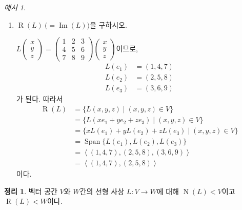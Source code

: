\documentclass[unfonts,oneside,a4paper]{oblivoir}
\theoremstyle{definition}
\theoremstyle{theorem}
\newtheorem{theorem}{정리}
\theoremstyle{remark}
\theoremstyle{remark}
\theoremstyle{remark}
\newtheorem*{example}{예시}
\theoremstyle{remark}
\renewcommand{\vec}[1]{\bm{\mathit{#1}}}
\DeclareMathOperator{\Span}{Span}
\DeclareMathOperator{\Null}{N}
\DeclareMathOperator{\Image}{Im}
\DeclareMathOperator{\Range}{R}
\begin{document}
\begin{example}
\begin{enumerate}
    \item $\Range (L)\ \bigl(= \Image(L)\bigr)$을 구하시오.
        \begin{solution}
            $L \begin{pmatrix}
                x \\ y \\ z
                \end{pmatrix} = \begin{pmatrix}
                1 & 2 & 3 \\ 4 & 5 & 6 \\ 7 & 8 & 9
                \end{pmatrix} \begin{pmatrix}
                x \\ y \\ z
            \end{pmatrix}$이므로,
            \begin{align*}
                L(\vec e_1) &= (1, 4, 7)\\
                L(\vec e_2) &= (2, 5, 8)\\
                L(\vec e_3) &= (3, 6, 9)
            \end{align*}
            가 된다.
            따라서
            \begin{align*}
                \Range (L) &= \{L(x, y, z) \mid (x, y, z) \in V\}\\
                           &= \{L(x \vec e_1 + y \vec e_2 + z \vec e_3) \mid (x, y, z) \in V\}\\
                           &= \{x L(\vec e_1) + y L(\vec e_2) + z L(\vec e_3) \mid (x, y, z) \in V\}\\
                           &= \Span \{L(\vec e_1), L(\vec e_2), L(\vec e_3)\}\\
                           &= \left<(1, 4, 7), (2, 5, 8), (3, 6, 9)\right>\\
                           &= \left<(1, 4, 7), (2, 5, 8)\right>
            \end{align*}
            이다.
        \end{solution}
\end{enumerate}
\end{example}

\begin{theorem} \label{thm:nullspace_range}
    벡터 공간 $V$와 $W$간의 선형 사상 $L: V \rightarrow W$에 대해 $\Null (L) < V$이고 $\Range (L) < W$이다.
\end{theorem}
\end{document}
